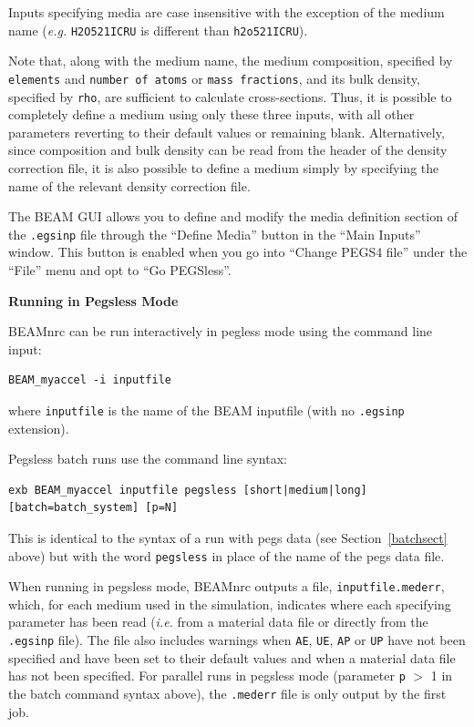 \documentclass[12pt,twoside]{article}
\begin{document}
Inputs specifying media are case insensitive with the exception of the medium name ({\it e.g.} {\tt H2O521ICRU} is
different than {\tt h2o521ICRU}).

Note that, along with the medium name, the medium composition, specified by {\tt elements} and {\tt number of atoms} or {\tt mass fractions}, and its bulk density, specified by {\tt rho}, are
sufficient to calculate cross-sections.  Thus, it is possible to completely define a medium
using only these three inputs, with all other parameters reverting to their default values or remaining blank.
Alternatively, since composition and bulk density can be read from the header of the density correction file, it is also possible to define a medium
simply by specifying the name of the relevant density correction file.

The BEAM GUI allows you to define and modify the media definition section of the {\tt .egsinp} file through the
``Define Media'' button in the ``Main Inputs'' window.  This button is enabled when you go into ``Change PEGS4 file''
under the ``File'' menu and opt to ``Go PEGSless''.

{\bf Running in Pegsless Mode}

BEAMnrc can be run interactively in pegless mode using the command line input:
\begin{verbatim}
BEAM_myaccel -i inputfile
\end{verbatim}
where {\tt inputfile} is the name of the BEAM inputfile (with no
{\tt .egsinp} extension).

Pegsless batch runs use the command line syntax:
\begin{verbatim}
exb BEAM_myaccel inputfile pegsless [short|medium|long] [batch=batch_system] [p=N]
\end{verbatim}
This is identical to the syntax of a run with pegs data (see Section~\ref{batchsect} above) but
with the word {\tt pegsless} in place of the name of the pegs data file.

When running in pegsless mode, BEAMnrc outputs a file, {\tt inputfile.mederr}, which, for each medium used
in the simulation, indicates where each specifying parameter has been read ({\it i.e.} from a material data
file or directly from the {\tt .egsinp} file).  The file also includes warnings when {\tt AE}, {\tt UE},
{\tt AP} or {\tt UP} have not been specified and have been set to their default values and when a material
data file has not been specified.  For parallel runs in pegsless mode (parameter {\tt p} $>$ 1 in the batch
command syntax above), the {\tt .mederr} file is only output by the first job.
\end{document}
